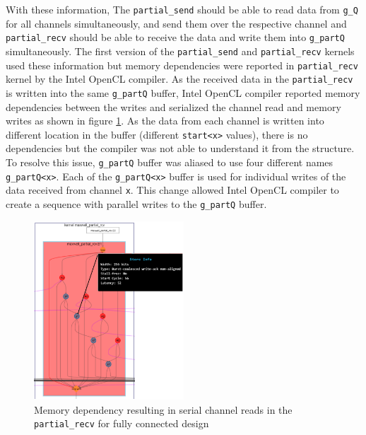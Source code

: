 With these information, The \texttt{partial\_send} should be able to read data from \texttt{g\_Q}
for all channels simultaneously, and send them over the respective channel and \texttt{partial\_recv}
should be able to receive the data and write them into \texttt{g\_partQ} simultaneously. The first
version of the \texttt{partial\_send} and \texttt{partial\_recv} kernels used these information
but memory dependencies were reported in \texttt{partial\_recv} kernel by the Intel OpenCL compiler.
As the received data in the \texttt{partial\_recv} is written into the same \texttt{g\_partQ} buffer,
Intel OpenCL compiler reported memory dependencies between the writes and serialized the channel
read and memory writes as shown in figure \ref{fig:serial_reads}. As the data from each channel is written
into different location in the buffer (different \texttt{start<x>} values), there is no
dependencies but the compiler was not able to understand it from the structure.
To resolve this issue, \texttt{g\_partQ} buffer was aliased to use four
different names \texttt{g\_partQ<x>}. Each of the \texttt{g\_partQ<x>} buffer is used
for individual writes of the data received from channel \texttt{x}. This change allowed
Intel OpenCL compiler to create a sequence with parallel writes to the \texttt{g\_partQ} buffer.
\begin{figure}[ht]%
    \centering
    \includegraphics[width=0.5\textwidth]{images/serial_reads}
    \caption{Memory dependency resulting in serial channel reads in the \texttt{partial\_recv}
    for fully connected design}
    \label{fig:serial_reads}
\end{figure}

